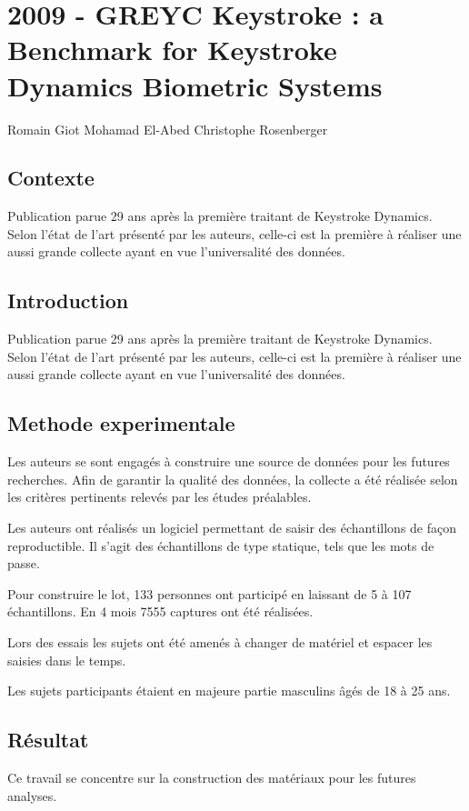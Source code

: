\section{2009 - GREYC Keystroke : a Benchmark for Keystroke Dynamics Biometric Systems}
Romain Giot
Mohamad El-Abed
Christophe Rosenberger

\subsection{Contexte}
Publication parue 29 ans après la première traitant de Keystroke Dynamics. Selon l'état de l'art présenté par les auteurs, celle-ci est la première à réaliser une aussi grande collecte ayant en vue l'universalité des données.

\subsection{Introduction}
Publication parue 29 ans après la première traitant de Keystroke Dynamics. Selon l'état de l'art présenté par les auteurs, celle-ci est la première à réaliser une aussi grande collecte ayant en vue l'universalité des données.

\subsection{Methode experimentale}
Les auteurs se sont engagés à construire une source de données pour les futures recherches. Afin de garantir la qualité des données, la collecte a été réalisée selon les critères pertinents relevés par les études préalables.

Les auteurs ont réalisés un logiciel permettant de saisir des échantillons de façon reproductible. Il s'agit des échantillons de type statique, tels que les mots de passe.

Pour construire le lot, 133 personnes ont participé en laissant de 5 à 107 échantillons. En 4 mois 7555 captures ont été réalisées.

Lors des essais les sujets ont été amenés à changer de matériel et espacer les saisies dans le temps.

Les sujets participants étaient en majeure partie masculins âgés de 18 à 25 ans.

\subsection{Résultat}
Ce travail se concentre sur la construction des matériaux pour les futures analyses.


